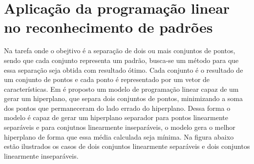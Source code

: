 \chapter{Aplicação da programação linear no reconhecimento de padrões}
Na tarefa onde o obejtivo é a separação de dois ou mais conjuntos de pontos, sendo que cada conjunto representa um padrão, busca-se um método para que essa separação seja obtida com resultado ótimo. Cada conjunto é o resultado de um conjunto de pontos e cada ponto é representado por um vetor de características.
Em \cite{Bennett92robustlinear} é proposto um modelo de programação linear capaz de um gerar um hiperplano, que separa dois conjuntos de pontos, minimizando a soma dos pontos que permaneceram do lado errado do hiperplano. Dessa forma o modelo é capaz de gerar um hiperplano separador para pontos linearmente separáveis e para conjutnos linearmente inseparáveis, o modelo gera o melhor hiperplano de forma que essa média calculada seja mínima. Na figura abaixo estão ilustrados os casos de dois conjuntos linearmente separáveis e dois conjuntos linearmente inseparáveis.
 
